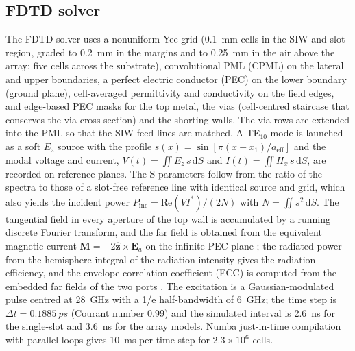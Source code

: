 \documentclass[preprint,12pt]{elsarticle}
\begin{document}
\subsection{FDTD solver}
The FDTD solver uses a nonuniform Yee grid (\SI{0.1}{mm} cells in the SIW and slot region, graded to \SI{0.2}{mm} in the margins and to \SI{0.25}{mm} in the air above the array; five cells across the substrate), convolutional PML (CPML) \cite{roden2000} on the lateral and upper boundaries, a perfect electric conductor (PEC) on the lower boundary (ground plane), cell-averaged permittivity and conductivity on the field edges, and edge-based PEC masks for the top metal, the vias (cell-centred staircase that conserves the via cross-section) and the shorting walls. The via rows are extended into the PML so that the SIW feed lines are matched. A TE$_{10}$ mode is launched as a soft $E_z$ source with the profile $s(x) = \sin[\pi(x-x_1)/a_{\mathrm{eff}}]$ and the modal voltage and current, $V(t) = \iint E_z\,s\,\mathrm{d}S$ and $I(t) = \iint H_x\,s\,\mathrm{d}S$, are recorded on reference planes. The S-parameters follow from the ratio of the spectra to those of a slot-free reference line with identical source and grid, which also yields the incident power $P_{\mathrm{inc}} = \mathrm{Re}(VI^\ast)/(2N)$ with $N = \iint s^2\,\mathrm{d}S$. The tangential field in every aperture of the top wall is accumulated by a running discrete Fourier transform, and the far field is obtained from the equivalent magnetic current $\mathbf{M} = -2\hat{\mathbf{z}}\times\mathbf{E}_a$ on the infinite PEC plane \cite{balanis2016}; the radiated power from the hemisphere integral of the radiation intensity gives the radiation efficiency, and the envelope correlation coefficient (ECC) is computed from the embedded far fields of the two ports \cite{blanch2003}. The excitation is a Gaussian-modulated pulse centred at 28~GHz with a 1/e half-bandwidth of 6~GHz; the time step is $\Delta t = \SI{0.1885}{ps}$ (Courant number 0.99) and the simulated interval is 2.6~ns for the single-slot and 3.6~ns for the array models. Numba just-in-time compilation with parallel loops gives \SI{10}{ms} per time step for $2.3\times10^6$ cells.
\end{document}
